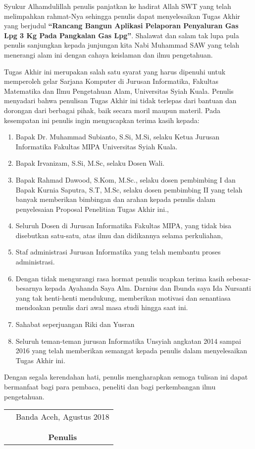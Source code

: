 \preface %


\par Syukur Alhamdulillah penulis panjatkan ke hadirat Allah SWT yang telah melimpahkan rahmat-Nya sehingga penulis dapat menyelesaikan Tugas Akhir yang berjudul \textbf{“Rancang Bangun Aplikasi Pelaporan Penyaluran Gas Lpg 3 Kg Pada Pangkalan Gas Lpg”}. Shalawat dan salam tak lupa pula penulis sanjungkan kepada junjungan kita Nabi Muhammad SAW yang telah menerangi alam ini dengan cahaya keislaman dan ilmu pengetahuan.
\par Tugas Akhir ini merupakan salah satu syarat yang harus dipenuhi untuk memperoleh gelar Sarjana Komputer di Jurusan Informatika, Fakultas Matematika dan Ilmu Pengetahuan Alam, Universitas Syiah Kuala. Penulis menyadari bahwa penulisan Tugas Akhir ini tidak terlepas dari bantuan dan dorongan dari berbagai pihak, baik secara moril maupun materil. Pada kesempatan ini penulis ingin mengucapkan terima kasih kepada:

\begin{enumerate}
	\item{Bapak Dr. Muhammad Subianto, S.Si, M.Si, selaku Ketua Jurusan Informatika Fakultas MIPA Universitas Syiah Kuala.}
	\item{Bapak Irvanizam, S.Si, M.Sc, selaku Dosen Wali.}
	\item{Bapak Rahmad Dawood, S.Kom, M.Sc., selaku dosen pembimbing I dan Bapak Kurnia Saputra, S.T, M.Sc, selaku dosen pembimbing II yang telah banyak memberikan bimbingan dan arahan kepada penulis dalam penyelesaian Proposal Penelitian Tugas Akhir ini.,}
	\item{Seluruh Dosen di Jurusan Informatika Fakultas MIPA, yang tidak bisa disebutkan satu-satu, atas ilmu dan didikannya selama perkuliahan,}
	\item {Staf administrasi Jurusan Informatika yang telah membantu proses administrasi.}
	\item{Dengan tidak mengurangi rasa hormat penulis ucapkan terima kasih sebesar- besarnya kepada Ayahanda Saya Alm. Darnius dan Ibunda saya Ida Nursanti yang tak henti-henti mendukung, memberikan motivasi dan senantiasa mendoakan penulis dari awal masa studi hingga saat ini.}
	\item {Sahabat seperjuangan Riki dan Yusran } 
	\item{Seluruh teman-teman jurusan Informatika Unsyiah angkatan 2014 sampai 2016 yang telah memberikan semangat kepada penulis dalam menyelesaikan Tugas Akhir ini.}
\end{enumerate}


Dengan segala kerendahan hati, penulis mengharapkan semoga tulisan ini
dapat bermanfaat bagi para pembaca, peneliti dan bagi perkembangan ilmu
pengetahuan.

\vspace{0.5cm}


\begin{tabular}{p{7.5cm}c}
	&Banda Aceh, Agustus 2018\\
	&\\
	&\\
	&\textbf{Penulis}
\end{tabular}